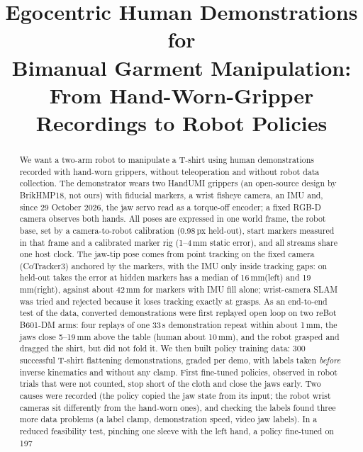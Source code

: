 \documentclass[conference,10pt]{IEEEtran}
\newcommand{\mm}{\,mm\xspace}
\begin{document}
\title{Egocentric Human Demonstrations for\\Bimanual Garment Manipulation:\\[1mm]\Large From Hand-Worn-Gripper Recordings to Robot Policies}
\author{
}
\maketitle

\begin{abstract}
We want a two-arm robot to manipulate a T-shirt using human demonstrations recorded with hand-worn grippers, without
teleoperation and without robot data collection. The demonstrator wears two HandUMI grippers (an open-source design by
BrikHMP18, not ours) with fiducial markers, a wrist fisheye camera, an IMU and, since 29 October 2026, the jaw servo read
as a torque-off encoder; a fixed RGB-D camera observes both hands. All poses are expressed in one world frame, the robot
base, set by a camera-to-robot calibration (0.98\,px held-out), start markers measured in that frame and a calibrated
marker rig (1--4\mm static error), and all streams share one host clock. The jaw-tip pose comes from point tracking on the
fixed camera (CoTracker3) anchored by the markers, with the IMU only inside tracking gaps: on held-out takes the error at
hidden markers has a median of 16\mm (left) and 19\mm (right), against about 42\mm for markers with IMU fill alone;
wrist-camera SLAM was tried and rejected because it loses tracking exactly at grasps. As an end-to-end test of the data,
converted demonstrations were first replayed open loop on two reBot B601-DM arms: four replays of one 33\,s
demonstration repeat within about 1\mm, the jaws close 5--19\mm above the table (human about 10\mm), and the robot
grasped and dragged the shirt, but did not fold it. We then built policy training data: 300 successful T-shirt
flattening demonstrations, graded per demo, with labels taken \emph{before} inverse kinematics and without any clamp.
First fine-tuned policies, observed in robot trials that were not counted, stop short of the cloth and close the jaws
early. Two causes were recorded (the policy copied the jaw state from its input; the robot wrist cameras sit differently
from the hand-worn ones), and checking the labels found three more data problems (a label clamp, demonstration speed,
video jaw labels). In a reduced feasibility test, pinching one sleeve with the left hand, a policy fine-tuned on 197

\end{abstract}
\end{document}
